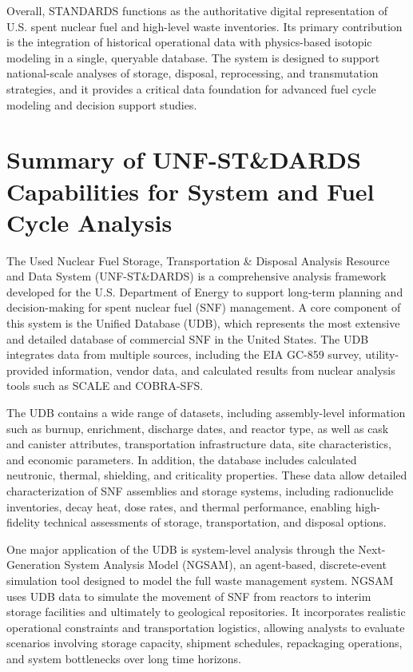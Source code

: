 Overall, STANDARDS functions as the authoritative digital representation of U.S. spent nuclear fuel and high-level waste 
inventories. Its primary contribution is the integration of historical operational data with physics-based isotopic modeling in 
a single, queryable database. The system is designed to support national-scale analyses of storage, disposal, reprocessing, and 
transmutation strategies, and it provides a critical data foundation for advanced fuel cycle modeling and decision support studies.

\section{Summary of UNF-ST\&DARDS Capabilities for System and Fuel Cycle Analysis}

The Used Nuclear Fuel Storage, Transportation \& Disposal Analysis Resource and Data System (UNF-ST\&DARDS) is a comprehensive 
analysis framework developed for the U.S. Department of Energy to support long-term planning and decision-making for spent nuclear 
fuel (SNF) management. A core component of this system is the Unified Database (UDB), which represents the most extensive and 
detailed database of commercial SNF in the United States. The UDB integrates data from multiple sources, including the EIA GC-859 
survey, utility-provided information, vendor data, and calculated results from nuclear analysis tools such as SCALE and COBRA-SFS.

The UDB contains a wide range of datasets, including assembly-level information such as burnup, enrichment, discharge dates, 
and reactor type, as well as cask and canister attributes, transportation infrastructure data, site characteristics, and 
economic parameters. In addition, the database includes calculated neutronic, thermal, shielding, and criticality properties. 
These data allow detailed characterization of SNF assemblies and storage systems, including radionuclide inventories, decay heat, 
dose rates, and thermal performance, enabling high-fidelity technical assessments of storage, transportation, and disposal options.

One major application of the UDB is system-level analysis through the Next-Generation System Analysis Model (NGSAM), 
an agent-based, discrete-event simulation tool designed to model the full waste management system. NGSAM uses UDB data to 
simulate the movement of SNF from reactors to interim storage facilities and ultimately to geological repositories. It incorporates 
realistic operational constraints and transportation logistics, allowing analysts to evaluate scenarios involving storage capacity, 
shipment schedules, repackaging operations, and system bottlenecks over long time horizons.

